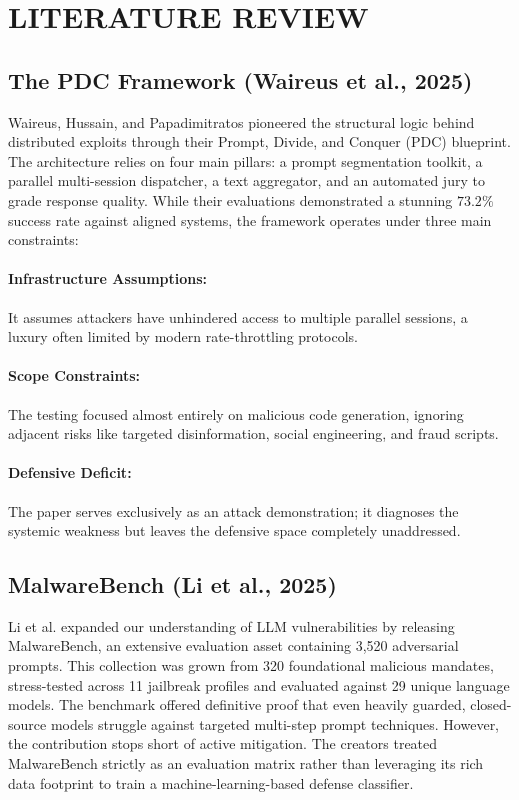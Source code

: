 \documentclass[conference]{IEEEtran}
\begin{document}
\section{LITERATURE REVIEW}

\subsection{\textbf{The PDC Framework (Waireus et al., 2025)}}

Waireus, Hussain, and Papadimitratos pioneered the structural logic behind distributed exploits through their Prompt, Divide, and Conquer (PDC) blueprint. The architecture relies on four main pillars: a prompt segmentation toolkit, a parallel multi-session dispatcher, a text aggregator, and an automated jury to grade response quality. While their evaluations demonstrated a stunning \(73.2\%\) success rate against aligned systems, the framework operates under three main constraints:

\paragraph{Infrastructure Assumptions:} It assumes attackers have unhindered access to multiple parallel sessions, a luxury often limited by modern rate-throttling protocols.

\paragraph{Scope Constraints:} The testing focused almost entirely on malicious code generation, ignoring adjacent risks like targeted disinformation, social engineering, and fraud scripts.

\paragraph{Defensive Deficit:} The paper serves exclusively as an attack demonstration; it diagnoses the systemic weakness but leaves the defensive space completely unaddressed.

\subsection{\textbf{MalwareBench (Li et al., 2025)}}

Li et al. expanded our understanding of LLM vulnerabilities by releasing MalwareBench, an extensive evaluation asset containing 3,520 adversarial prompts. This collection was grown from 320 foundational malicious mandates, stress-tested across 11 jailbreak profiles and evaluated against 29 unique language models. The benchmark offered definitive proof that even heavily guarded, closed-source models struggle against targeted multi-step prompt techniques. However, the contribution stops short of active mitigation. The creators treated MalwareBench strictly as an evaluation matrix rather than leveraging its rich data footprint to train a machine-learning-based defense classifier.
\end{document}

